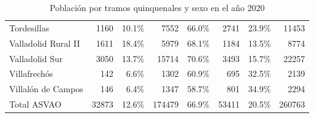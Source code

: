 \begin{table}[H]
\begin{tabular}{lrrrrrrr}
        Tordesillas              & 1160          & 10.1\%           & 7552           & 66.0\%           & 2741          & 23.9\%           & 11453          \\
        Valladolid Rural II      & 1611          & 18.4\%           & 5979           & 68.1\%           & 1184          & 13.5\%           & 8774           \\
        Valladolid Sur           & 3050          & 13.7\%           & 15714          & 70.6\%           & 3493          & 15.7\%           & 22257          \\
        Villafrechós             & 142           & 6.6\%            & 1302           & 60.9\%           & 695           & 32.5\%           & 2139           \\
        Villalón de Campos       & 146           & 6.4\%            & 1347           & 58.7\%           & 801           & 34.9\%           & 2294           \\
        \midrule
        Total ASVAO              & 32873         & 12.6\%           & 174479         & 66.9\%           & 53411         & 20.5\%           & 260763         \\
        \bottomrule
    \end{tabular}
    \caption{Población por tramos quinquenales y sexo en el año 2020}
    \label{tab:poblacion}
\end{table}